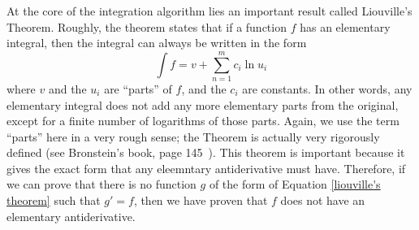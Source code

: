 At the core of the \gls{integration} algorithm lies an important result
called Liouville's Theorem.  Roughly, the theorem states that if a
function $f$ has an \gls{elementary} integral, then the integral can
always be written in the form
\begin{equation}
\label{liouville's theorem}
\int{f} = v + \sum_{n=1}^m{c_i\ln{u_i}}
\end{equation}
where $v$ and the $u_i$ are ``parts'' of $f$, and the $c_i$ are
constants.  In other words, any \gls{elementary} integral does not add
any more \gls{elementary} parts from the original, except for a finite
number of logarithms of those parts.  Again, we use the term ``parts''
here in a very rough sense; the Theorem is actually very rigorously
defined (see Bronstein's book, page 145~\cite{bronstein2005symbolic}). 
This theorem is important because it gives the exact form that any
eleemntary antiderivative must have. Therefore, if we can prove that
there is no function $g$ of the form of Equation \ref{liouville's
theorem} such that $g'=f$, then we have proven that $f$ does not have an
\gls{elementary} antiderivative. 